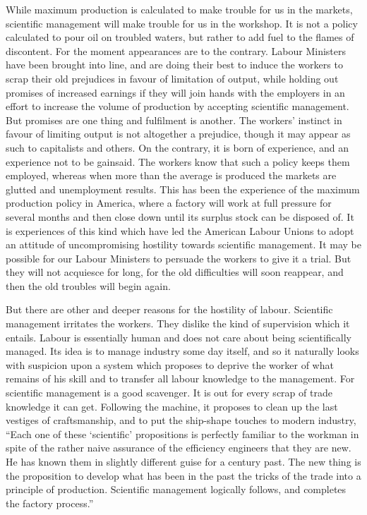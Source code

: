\documentclass{book}
\begin{document}
While maximum production is calculated to make trouble for us in the markets, scientific management will make trouble for us in the workshop. It is not a policy calculated to pour oil on troubled waters, but rather to add fuel to the flames of discontent. For the moment appearances are to the contrary. Labour Ministers have been brought into line, and are doing their best to induce the workers to scrap their old prejudices in favour of limitation of output, while holding out promises of increased earnings if they will join hands with the employers in an effort to increase the volume of production by accepting scientific management. But promises are one thing and fulfilment is another. The workers’ instinct in favour of limiting output is not altogether a prejudice, though it may appear as such to capitalists and others. On the contrary, it is born of experience, and an experience not to be gainsaid. The workers know that such a policy keeps them employed, whereas when more than the average is produced the markets are glutted and unemployment results. This has been the experience of the maximum production policy in America, where a factory will work at full pressure for several months and then close down until its surplus stock can be disposed of. It is experiences of this kind which have led the American Labour Unions to adopt an attitude of uncompromising hostility towards scientific management. It may be possible for our Labour Ministers to persuade the workers to give it a trial. But they will not acquiesce for long, for the old difficulties will soon reappear, and then the old troubles will begin again.

But there are other and deeper reasons for the hostility of labour. Scientific management irritates the workers. They dislike the kind of supervision which it entails. Labour is essentially human and does not care about being scientifically managed. Its idea is to manage industry some day itself, and so it naturally looks with suspicion upon a system which proposes to deprive the worker of what remains of his skill and to transfer all labour knowledge to the management. For scientific management is a good scavenger. It is out for every scrap of trade knowledge it can get. Following the machine, it proposes to clean up the last vestiges of craftsmanship, and to put the ship-shape touches to modern industry, “Each one of these ‘scientific’ propositions is perfectly familiar to the workman in spite of the rather naive assurance of the efficiency engineers that they are new. He has known them in slightly different guise for a century past. The new thing is the proposition to develop what has been in the past the tricks of the trade into a principle of production. Scientific management logically follows, and completes the factory process.”\footnotemark[2]
\end{document}
